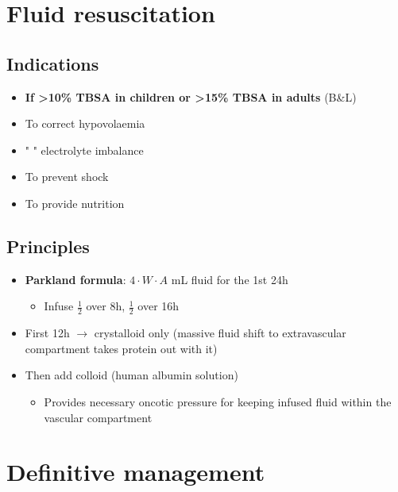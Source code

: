 \documentclass[
  14pt,
]{memoir}
\providecommand{\tightlist}{%
  \setlength{\itemsep}{0pt}\setlength{\parskip}{0pt}}
\begin{document}
\hypertarget{fluid-resuscitation}{%
\section{Fluid resuscitation}\label{fluid-resuscitation}}

\hypertarget{indications-1}{%
\subsection{Indications}\label{indications-1}}

\begin{itemize}
\tightlist
\item
  \textbf{If \textgreater10\% TBSA in children or \textgreater15\% TBSA
  in adults} (B\&L)
\item
  To correct hypovolaemia
\item
  " " electrolyte imbalance
\item
  To prevent shock
\item
  To provide nutrition
\end{itemize}

\hypertarget{principles}{%
\subsection{Principles}\label{principles}}

\begin{itemize}
\tightlist
\item
  \textbf{Parkland formula}: \(4\cdot W \cdot A\) mL fluid for the 1st
  24h

  \begin{itemize}
  \tightlist
  \item
    Infuse \(\frac{1}{2}\) over 8h, \(\frac{1}{2}\) over 16h
  \end{itemize}
\item
  First 12h \(\rightarrow\) crystalloid only (massive fluid shift to
  extravascular compartment takes protein out with it)
\item
  Then add colloid (human albumin solution)

  \begin{itemize}
  \tightlist
  \item
    Provides necessary oncotic pressure for keeping infused fluid within
    the vascular compartment
  \end{itemize}
\end{itemize}

\hypertarget{definitive-management}{%
\section{Definitive management}\label{definitive-management}}
\end{document}
